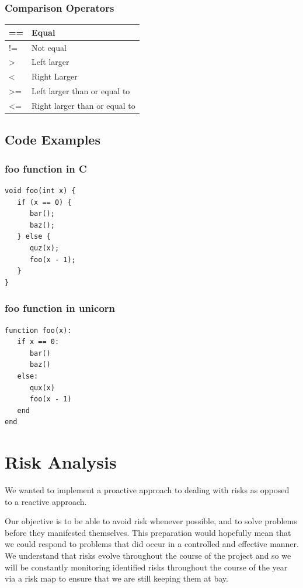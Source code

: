 \documentclass[a4paper,11pt]{article}
\begin{document}
\begin{multicols}{2}
\subsubsection*{Comparison Operators}
\begin{tabular}{| l | l | } \hline
== & Equal \\ \hline
!= & Not equal \\ \hline
\textgreater & Left larger \\ \hline
\textless & Right Larger \\ \hline
\textgreater= & Left larger than or equal to \\ \hline
\textless= & Right larger than or equal to \\ \hline
\end{tabular}

\end{multicols}

\subsection*{Code Examples}
\begin{multicols}{2}
\subsubsection*{foo function in C}
\begin{lstlisting}
void foo(int x) {
   if (x == 0) {
      bar();
      baz();
   } else {
      quz(x);
      foo(x - 1);
   }
}
\end{lstlisting}
\subsubsection*{foo function in unicorn}
\begin{lstlisting}
function foo(x):
   if x == 0:
      bar()
      baz()
   else:
      qux(x)
      foo(x - 1)
   end
end
\end{lstlisting}
\end{multicols}

\pagebreak
\section{Risk Analysis}

We wanted to implement a proactive approach to dealing with risks as opposed to a reactive approach.

Our objective is to be able to avoid risk whenever possible, and to solve problems before they manifested themselves. This preparation would hopefully mean that we could respond to problems that did occur in a controlled and effective manner. We understand that risks evolve throughout the course of the project and so we will be constantly monitoring identified risks throughout the course of the year via a risk map to ensure that we are still keeping them at bay. 
\end{document}
